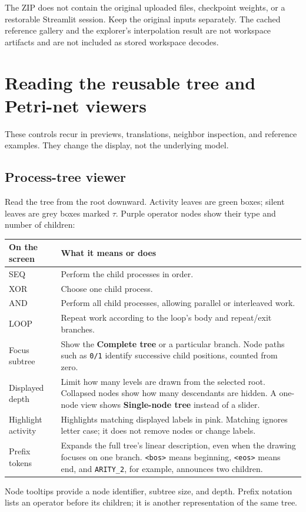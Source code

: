 \documentclass[11pt,a4paper]{article}
\makeatletter
\newcommand{\ui}[1]{\textbf{#1}}
\newcommand{\code}[1]{\nolinkurl{#1}}
\newenvironment{controls}{%
  \small\begin{longtable}{@{}>{\raggedright\arraybackslash}p{.34\linewidth}
    >{\raggedright\arraybackslash}p{.62\linewidth}@{}}
  \toprule\textbf{On the screen} & \textbf{What it means or does}\\\midrule\endhead
  \bottomrule\endfoot
}{\end{longtable}\normalsize}
\makeatother
\begin{document}
The ZIP does not contain the original uploaded files, checkpoint weights, or
a restorable Streamlit session. Keep the original inputs separately. The
cached reference gallery and the explorer's interpolation result are not
workspace artifacts and are not included as stored workspace decodes.

\section{Reading the reusable tree and Petri-net viewers}
\label{sec:viewers}
These controls recur in previews, translations, neighbor inspection, and
reference examples. They change the display, not the underlying model.

\subsection{Process-tree viewer}
Read the tree from the root downward. Activity leaves are green boxes;
silent leaves are grey boxes marked $\tau$. Purple operator nodes show their
type and number of children:
\begin{controls}
SEQ & Perform the child processes in order.\\
XOR & Choose one child process.\\
AND & Perform all child processes, allowing parallel or interleaved work.\\
LOOP & Repeat work according to the loop's body and repeat/exit branches.\\
Focus subtree & Show the \ui{Complete tree} or a particular branch. Node paths
such as \code{0/1} identify successive child positions, counted from zero.\\
Displayed depth & Limit how many levels are drawn from the selected root.
Collapsed nodes show how many descendants are hidden. A one-node view shows
\ui{Single-node tree} instead of a slider.\\
Highlight activity & Highlights matching displayed labels in pink. Matching
ignores letter case; it does not remove nodes or change labels.\\
Prefix tokens & Expands the full tree's linear description, even when the
drawing focuses on one branch. \code{<bos>} means beginning, \code{<eos>}
means end, and \code{ARITY_2}, for example, announces two children.\\
\end{controls}

Node tooltips provide a node identifier, subtree size, and depth. Prefix
notation lists an operator before its children; it is another representation
of the same tree.
\end{document}
